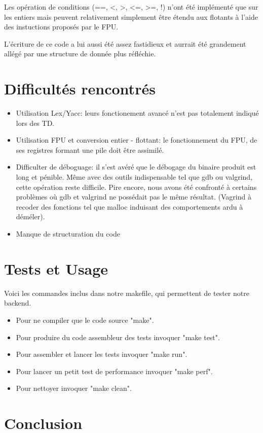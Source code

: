 \documentclass[a4paper, 11pt]{article}
\begin{document}
Les opération de conditions (==, <, >, <=, >=, !) n'ont été implémenté que sur les entiers mais peuvent relativement simplement être étendu
aux flotants à l'aide des instuctions proposés par le FPU.

L'écriture de ce code a lui aussi été assez fastidieux et aurrait été grandement allégé par une structure de donnée plus réfléchie.

\section{Difficultés rencontrés}
\begin{itemize}
\item Utilisation Lex/Yacc: leurs fonctionement avancé n'est pas totalement indiqué lors des TD.
\item Utilisation FPU et conversion entier - flottant: le fonctionnement du FPU, de ses registres formant une pile doit être assimilé.
\item Difficulter de déboguage: il s'est avéré que le débogage du binaire produit est long et pénible. Même avec des outils indispensable tel que gdb ou valgrind, cette opération reste difficile. Pire encore, nous avons été confronté à certains problèmes où gdb et valgrind ne possédait
pas le même résultat. (Vagrind à recoder des fonctions tel que malloc induisant des comportements ardu à déméler).
\item Manque de structuration du code
\end{itemize}
\section{Tests et Usage}

Voici les commandes inclus dans notre makefile, qui permettent de tester notre backend.
\begin{itemize}
\item Pour ne compiler que le code source "make".
\item Pour produire du code assembleur des tests invoquer "make test".
\item Pour assembler et lancer les tests invoquer "make run".
\item Pour lancer un petit test de performance invoquer "make perf".
\item Pour nettoyer invoquer "make clean".
\end{itemize}
\section{Conclusion}
\end{document}

